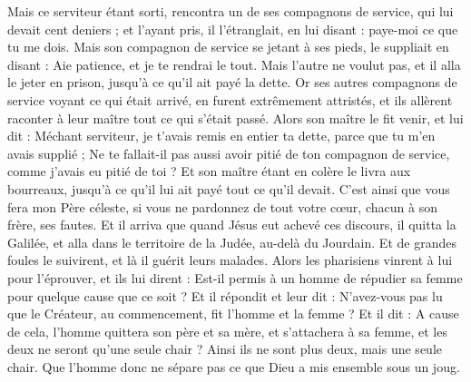 \begin{multicols}{2}
Mais ce serviteur étant sorti, rencontra un de ses compagnons de service, qui lui devait cent deniers ; et l’ayant pris, il l’étranglait, en lui disant : paye-moi ce que tu me dois.
Mais son compagnon de service se jetant à ses pieds, le suppliait en disant : Aie patience, et je te rendrai le tout.
Mais l’autre ne voulut pas, et il alla le jeter en prison, jusqu'à ce qu'il ait payé la dette.
Or ses autres compagnons de service voyant ce qui était arrivé, en furent extrêmement attristés, et ils allèrent raconter à leur maître tout ce qui s'était passé.
Alors son maître le fit venir, et lui dit : Méchant serviteur, je t’avais remis en entier ta dette, parce que tu m'en avais supplié ;
Ne te fallait-il pas aussi avoir pitié de ton compagnon de service, comme j’avais eu pitié de toi ?
Et son maître étant en colère le livra aux bourreaux, jusqu'à ce qu'il lui ait payé tout ce qu’il devait.
C’est ainsi que vous fera mon Père céleste, si vous ne pardonnez de tout votre cœur, chacun à son frère, ses fautes.
\VerseOne{}Et il arriva que quand Jésus eut achevé ces discours, il quitta la Galilée, et alla dans le territoire de la Judée, au-delà du Jourdain.
Et de grandes foules le suivirent, et là il guérit leurs malades.
Alors les pharisiens vinrent à lui pour l'éprouver, et ils lui dirent : Est-il permis à un homme de répudier sa femme pour quelque cause que ce soit ?
Et il répondit et leur dit : N'avez-vous pas lu que le Créateur, au commencement, fit l’homme et la femme ?
Et il dit : A cause de cela, l'homme quittera son père et sa mère, et s’attachera à sa femme, et les deux ne seront qu'une seule chair ?
Ainsi ils ne sont plus deux, mais une seule chair. Que l’homme donc ne sépare pas ce que Dieu a mis ensemble sous un joug.

\end{multicols}

